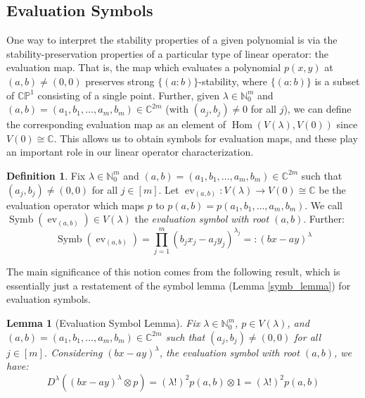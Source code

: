 \documentclass{article}
\newtheorem{lemma}[theorem]{Lemma}
\theoremstyle{definition}
\newtheorem{definition}[theorem]{Definition}
\newtheorem{remark}[theorem]{Remark}
\theoremstyle{plain}
\newcommand{\C}{\mathbb{C}}
\newcommand{\N}{\mathbb{N}}
\newcommand{\CP}{\mathbb{CP}}
\DeclareMathOperator{\Symb}{Symb}
\DeclareMathOperator{\Hom}{Hom}
\DeclareMathOperator{\ev}{ev}
\begin{document}
\subsection{Evaluation Symbols}

One way to interpret the stability properties of a given polynomial is via the stability-preservation properties of a particular type of linear operator: the evaluation map. That is, the map which evaluates a polynomial $p(x,y)$ at $(a,b) \neq (0,0)$ preserves strong $\{(a:b)\}$-stability, where $\{(a:b)\}$ is a subset of $\CP^1$ consisting of a single point. Further, given $\lambda \in \N_0^m$ and $(a,b) = (a_1,b_1,\ldots,a_m,b_m) \in \C^{2m}$ (with $(a_j,b_j) \neq 0$ for all $j$), we can define the corresponding evaluation map as an element of $\Hom(V(\lambda),V(0))$ since $V(0) \cong \C$. This allows us to obtain symbols for evaluation maps, and these play an important role in our linear operator characterization.

\begin{definition} \label{ev_def}
    Fix $\lambda \in \N_0^m$ and $(a,b) = (a_1,b_1,\ldots,a_m,b_m) \in \C^{2m}$ such that $(a_j,b_j) \neq (0,0)$ for all $j \in [m]$. Let $\ev_{(a,b)}: V(\lambda) \rightarrow V(0) \cong \C$ be the evaluation operator which maps $p$ to $p(a,b) = p(a_1,b_1,\ldots,a_m,b_m)$. We call $\Symb(\ev_{(a,b)}) \in V(\lambda)$ the \emph{evaluation symbol with root $(a,b)$}. Further:
    \[
        \Symb(\ev_{(a,b)}) = \prod_{j=1}^m (b_jx_j - a_jy_j)^{\lambda_j} =: (bx - ay)^\lambda
    \]
\end{definition}

The main significance of this notion comes from the following result, which is essentially just a restatement of the symbol lemma (Lemma \ref{symb_lemma}) for evaluation symbols.

\begin{lemma}[Evaluation Symbol Lemma]\label{ev_lemma}
    Fix $\lambda \in \N_0^m$, $p \in V(\lambda)$, and $(a,b) = (a_1,b_1,\ldots,a_m,b_m) \in \C^{2m}$ such that $(a_j,b_j) \neq (0,0)$ for all $j \in [m]$. Considering $(bx-ay)^\lambda$, the evaluation symbol with root $(a,b)$, we have:
    \[
        D^\lambda((bx-ay)^\lambda \otimes p) = (\lambda!)^2 p(a,b) \otimes 1 = (\lambda!)^2 p(a,b)
    \]
\end{lemma}

\end{document}
